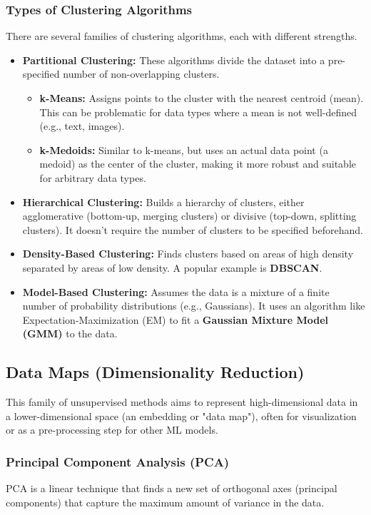 \documentclass{article}
\begin{document}
\begin{multicols}{2}
	\subsubsection{Types of Clustering Algorithms}
	There are several families of clustering algorithms, each with different strengths.
	\begin{itemize}
		\item \textbf{Partitional Clustering:} These algorithms divide the dataset into a pre-specified number of non-overlapping clusters.
		      \begin{itemize}
			      \item \textbf{k-Means:} Assigns points to the cluster with the nearest centroid (mean). This can be problematic for data types where a mean is not well-defined (e.g., text, images).
			      \item \textbf{k-Medoids:} Similar to k-means, but uses an actual data point (a medoid) as the center of the cluster, making it more robust and suitable for arbitrary data types.
		      \end{itemize}
		\item \textbf{Hierarchical Clustering:} Builds a hierarchy of clusters, either agglomerative (bottom-up, merging clusters) or divisive (top-down, splitting clusters). It doesn't require the number of clusters to be specified beforehand.
		\item \textbf{Density-Based Clustering:} Finds clusters based on areas of high density separated by areas of low density. A popular example is \textbf{DBSCAN}.
		\item \textbf{Model-Based Clustering:} Assumes the data is a mixture of a finite number of probability distributions (e.g., Gaussians). It uses an algorithm like Expectation-Maximization (EM) to fit a \textbf{Gaussian Mixture Model (GMM)} to the data.
	\end{itemize}

	\subsection{Data Maps (Dimensionality Reduction)}
	This family of unsupervised methods aims to represent high-dimensional data in a lower-dimensional space (an embedding or "data map"), often for visualization or as a pre-processing step for other ML models.

	\subsubsection{Principal Component Analysis (PCA)}
	PCA is a linear technique that finds a new set of orthogonal axes (principal components) that capture the maximum amount of variance in the data.


\end{multicols}
\end{document}
